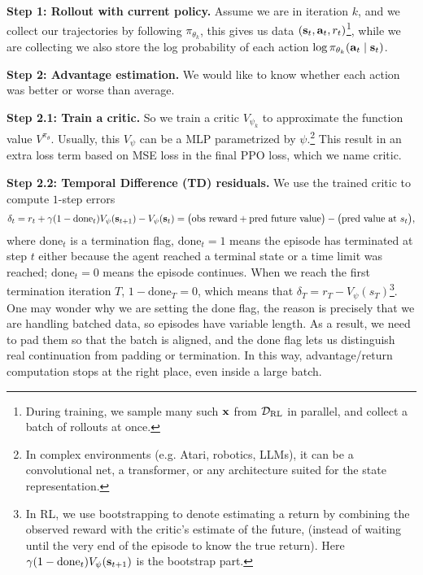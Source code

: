 \documentclass[11pt]{article}  %
\begin{document}
\textbf{Step 1: Rollout with current policy.} 
Assume we are in iteration $k$, and we collect our trajectories by following $\pi_{\theta_k}$, this gives us data $\left( \mathbf{s}_t, \mathbf{a}_t, r_t \right)$\footnote{During training, we sample many such $\mathbf{x}$ from $\mathcal{D}_{\text{RL}}$ in parallel, and collect a batch of rollouts at once.},
while we are collecting we also store the log probability of each action $\log \pi_{\theta_k}(\mathbf{a}_t \mid \mathbf{s}_t)$.

\textbf{Step 2: Advantage estimation.}
We would like to know whether each action was better or worse than average.

\textbf{Step 2.1: Train a critic.}
So we train a critic $V_{\psi_k}$ to approximate the function value $V^{\pi_\theta}$.
Usually, this $V_{\psi}$ can be a MLP parametrized by $\psi$.\footnote{In complex environments (e.g. Atari, robotics, LLMs), it can be a convolutional net, a transformer, or any architecture suited for the state representation.}
This result in an extra loss term based on MSE loss in the final PPO loss, which we name critic.

\textbf{Step 2.2: Temporal Difference (TD) residuals.}
We use the trained critic to compute $1$-step errors 
\begin{align*}
  \delta_t = r_t + \gamma (1 - \text{done}_t)V_{\psi}(\mathbf{s}_{t+1}) - V_\psi(\mathbf{s}_t) = \big(\text{obs reward} + \text{pred future value}\big) - \big(\text{pred value at } s_t\big),
\end{align*}
where $\text{done}_t$ is a termination flag, $\text{done}_t = 1$ means the episode has terminated at step $t$ either because the agent reached a terminal state or a time limit was reached; $\text{done}_t = 0$ means the episode continues.
When we reach the first termination iteration $T$, $1 - \text{done}_T = 0$, which means that $\delta_T = r_T - V_{\psi}(s_T)$\footnote{In RL, we use bootstrapping to denote estimating a return by combining the observed reward with the critic's estimate of the future, (instead of waiting until the very end of the episode to know the true return). Here $\gamma (1 - \text{done}_t)V_{\psi}(\mathbf{s}_{t+1})$ is the bootstrap part.}. 
One may wonder why we are setting the done flag, the reason is precisely that we are handling batched data, so episodes have variable length. 
As a result, we need to pad them so that the batch is aligned, and the done flag lets us distinguish real continuation from padding or termination.
In this way, advantage/return computation stops at the right place, even inside a large batch.
\end{document}

